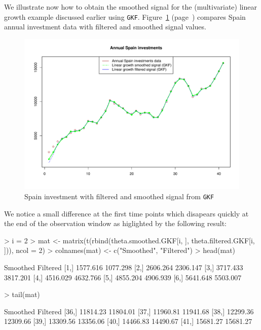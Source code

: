 \documentclass{article}
\newcommand{\GKF}{\texttt{GKF}\xspace}
\begin{document}
We illustrate now how to obtain the smoothed signal for the (multivariate) linear growth
example discussed earlier using \GKF.  Figure~\ref{fig:LGSmooth}
(page~\pageref{fig:LGSmooth}) compares Spain annual investment data with filtered and
smoothed signal values.
\begin{figure}[htbp]
  \centering
\includegraphics{vignette-020}
\caption{Spain investment with filtered and smoothed signal from \GKF}
\label{fig:LGSmooth}
\end{figure}

We notice a small difference at the first time points which disapears quickly at the end of
the observation window as higlighted by the following result:
\begin{Schunk}
\begin{Sinput}
> i = 2
> mat <- matrix(t(rbind(theta.smoothed.GKF[i, ], theta.filtered.GKF[i, ])), ncol = 2)
> colnames(mat) <- c("Smoothed", "Filtered")
> head(mat)
\end{Sinput}
\begin{Soutput}
     Smoothed Filtered
[1,] 1577.616 1077.298
[2,] 2606.264 2306.147
[3,] 3717.433 3817.201
[4,] 4516.029 4632.766
[5,] 4855.204 4906.939
[6,] 5641.648 5503.007
\end{Soutput}
\begin{Sinput}
> tail(mat)
\end{Sinput}
\begin{Soutput}
      Smoothed Filtered
[36,] 11814.23 11804.01
[37,] 11960.81 11941.68
[38,] 12299.36 12309.66
[39,] 13309.56 13356.06
[40,] 14466.83 14490.67
[41,] 15681.27 15681.27
\end{Soutput}
\end{Schunk}
\end{document}
